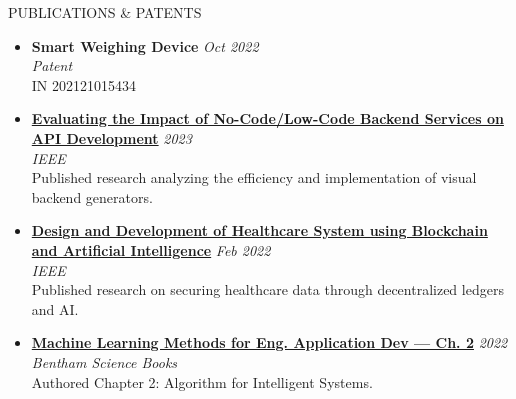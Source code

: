 \documentclass{resume} %
\begin{document}
\begin{rSection}{PUBLICATIONS \& PATENTS} 

\begin{itemize}
    \itemsep -3pt {} 
    
    \item \textbf{Smart Weighing Device} \hfill \textit{Oct 2022} \\
    \textit{Patent} \\
    IN 202121015434

    \item \textbf{\href{https://ieeexplore.ieee.org/abstract/document/10306945/}{Evaluating the Impact of No-Code/Low-Code Backend Services on API Development}} \hfill \textit{2023} \\
    \textit{IEEE} \\
    Published research analyzing the efficiency and implementation of visual backend generators.

    \item \textbf{\href{https://ieeexplore.ieee.org/document/9697213}{Design and Development of Healthcare System using Blockchain and Artificial Intelligence}} \hfill \textit{Feb 2022} \\
    \textit{IEEE} \\
    Published research on securing healthcare data through decentralized ledgers and AI.

    \item \textbf{\href{https://www.eurekaselect.com/chapter/18162}{Machine Learning Methods for Eng. Application Dev — Ch. 2}} \hfill \textit{2022} \\
    \textit{Bentham Science Books} \\
    Authored Chapter 2: Algorithm for Intelligent Systems.

\end{itemize}

\end{rSection}
\end{document}
